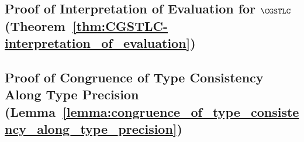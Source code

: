 \subsection{Proof of Interpretation of Evaluation for $\CGSTLC$ (Theorem~\ref{thm:CGSTLC-interpretation_of_evaluation})}
\label{subsec:proof_of_interpretation_of_evaluation_for_CGSTLC}



\subsection{Proof of Congruence of Type Consistency Along Type Precision (Lemma~\ref{lemma:congruence_of_type_consistency_along_type_precision})}
\label{subsec:proof_of_congruence_of_type_consistency_along_type_precision_lemma:congruence_of_type_consistency_along_type_precision}

